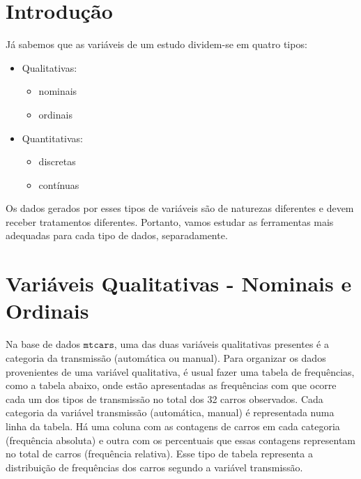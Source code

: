 \documentclass[
]{book}
\providecommand{\tightlist}{%
  \setlength{\itemsep}{0pt}\setlength{\parskip}{0pt}}
\begin{document}
\hypertarget{introduuxe7uxe3o-1}{%
\section{Introdução}\label{introduuxe7uxe3o-1}}

Já sabemos que as variáveis de um estudo dividem-se em quatro tipos:

\begin{itemize}
\tightlist
\item
  Qualitativas:

  \begin{itemize}
  \tightlist
  \item
    nominais
  \item
    ordinais
  \end{itemize}
\item
  Quantitativas:

  \begin{itemize}
  \tightlist
  \item
    discretas
  \item
    contínuas
  \end{itemize}
\end{itemize}

Os dados gerados por esses tipos de variáveis são de naturezas diferentes e devem receber tratamentos diferentes. Portanto, vamos estudar as ferramentas mais adequadas para cada tipo de dados, separadamente.

\hypertarget{variuxe1veis-qualitativas---nominais-e-ordinais}{%
\section{Variáveis Qualitativas - Nominais e Ordinais}\label{variuxe1veis-qualitativas---nominais-e-ordinais}}

Na base de dados \(\texttt{mtcars}\), uma das duas variáveis qualitativas presentes é a categoria da transmissão (automática ou manual). Para organizar os dados provenientes de uma variável qualitativa, é usual fazer uma tabela de frequências, como a tabela abaixo, onde estão apresentadas as frequências com que ocorre cada um dos tipos de transmissão no total dos 32 carros observados. Cada categoria da variável transmissão (automática, manual) é representada numa linha da tabela. Há uma coluna com as contagens de carros em cada categoria (frequência absoluta) e outra com os percentuais que essas contagens representam no total de carros (frequência relativa). Esse tipo de tabela representa a distribuição de frequências dos carros segundo a variável transmissão.
\end{document}
